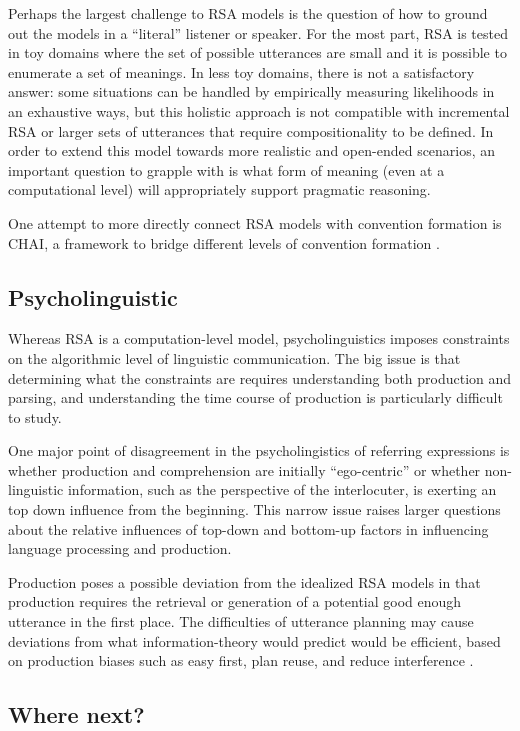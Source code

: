 \documentclass[]{article}
\begin{document}
Perhaps the largest challenge to RSA models is the question of how to ground out the models in a ``literal'' listener or speaker. For the most part, RSA is tested in toy domains where the set of possible utterances are small and it is possible to enumerate a set of meanings. In less toy domains, there is not a satisfactory answer: some situations can be handled by empirically measuring likelihoods in an exhaustive ways, but this holistic approach is not compatible with incremental RSA or larger sets of utterances that require compositionality to be defined. In order to extend this model towards more realistic and open-ended scenarios, an important question to grapple with is what form of meaning (even at a computational level) will appropriately support pragmatic reasoning. 

One attempt to more directly connect RSA models with convention formation is CHAI, a framework to bridge different levels of convention formation \cite{hawkins2021}. 

\subsection{Psycholinguistic}

Whereas RSA is a computation-level model, psycholinguistics imposes constraints on the algorithmic level of linguistic communication. The big issue is that determining what the constraints are requires understanding both production and parsing, and understanding the time course of production is particularly difficult to study. 

One major point of disagreement in the psycholingistics of referring expressions is whether production and comprehension are initially ``ego-centric'' or whether non-linguistic information, such as the perspective of the interlocuter, is exerting an top down influence from the beginning. This narrow issue raises larger questions about the relative influences of top-down and bottom-up factors in influencing language processing and production.

Production poses a possible deviation from the idealized RSA models in that production requires the retrieval or generation of a potential good enough utterance in the first place. The difficulties of utterance planning may cause deviations from what information-theory would predict would be efficient, based on production biases such as easy first, plan reuse, and reduce interference \cite{macdonald2013}. 

\subsection{Where next?}
\end{document}
